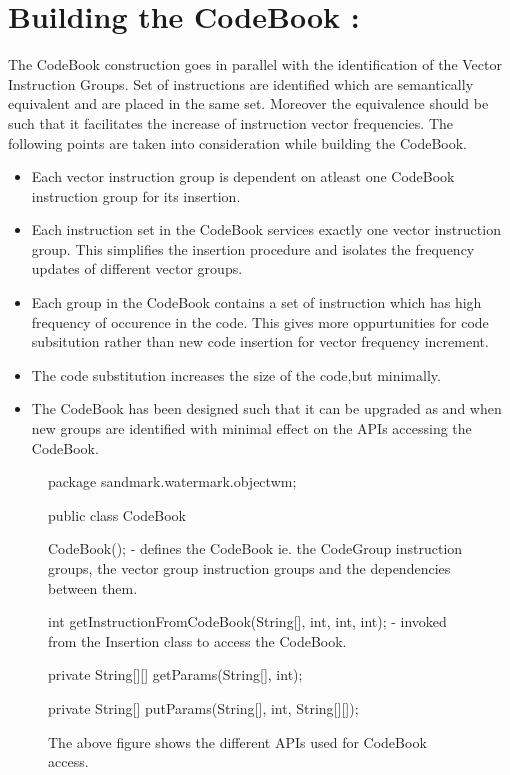 \section{Building the CodeBook : } The CodeBook construction goes in parallel
with the identification of the Vector Instruction Groups. Set of instructions 
are identified which are semantically equivalent and are placed in the same set.
Moreover the equivalence should be such that it facilitates the increase of 
instruction vector frequencies. The following points are taken into 
consideration while building the CodeBook.

\begin{itemize}
   \item [1.] Each vector instruction group is dependent on atleast one CodeBook
              instruction group for its insertion. 
   \item [2.] Each instruction set in the CodeBook services exactly one vector
              instruction group. This simplifies the insertion procedure and
	      isolates the frequency updates of different vector groups.
   \item [3.] Each group in the CodeBook contains a set of instruction which 
              has high frequency of occurence in the code. This gives more 
	      oppurtunities for code subsitution rather than new code insertion
	      for vector frequency increment.
   \item [4.] The code substitution increases the size of the code,but minimally.
   \item [5.] The CodeBook has been designed such that it can be upgraded as 
              and when new groups are identified with minimal effect on the 
	      APIs accessing the CodeBook.
\end{itemize}

\begin{figure}
\begin{listing}{1}
package sandmark.watermark.objectwm;

public class CodeBook {

   CodeBook();
      - defines the CodeBook ie. the CodeGroup instruction groups, the vector 
        group instruction groups and the dependencies between them.

   int getInstructionFromCodeBook(String[], int, int, int);
      - invoked from the Insertion class to access the CodeBook.

      private String[][] getParams(String[], int);

      private String[] putParams(String[], int, String[][]);

}
\end{listing}
\caption{The above figure shows the different APIs used for CodeBook access.}
\label{}
\end{figure}


